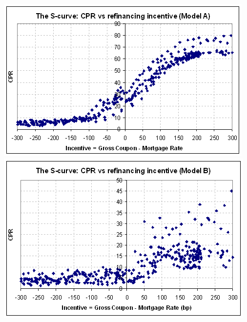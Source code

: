 \documentclass[10pt,letterpaper]{article}
\begin{document}
\begin{center}
\includegraphics[scale=0.6]{CPRtoRefinChartModelA.png}\\
\includegraphics[scale=0.6]{CPRtoRefinChartModelB.png}\\
\end{center}
\end{document}
